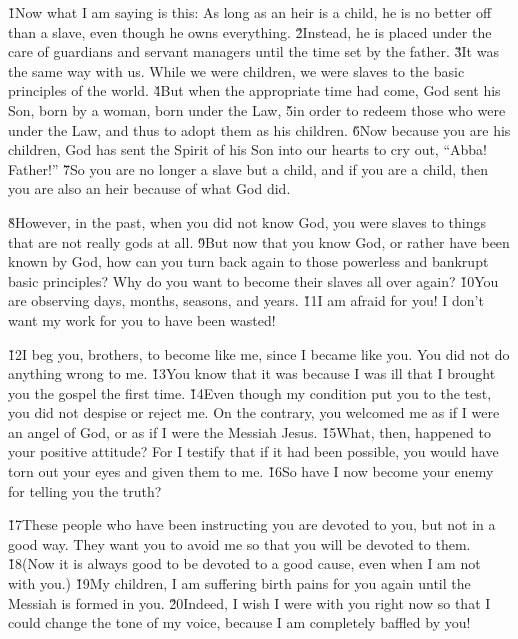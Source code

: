 \v{1}Now what I am saying is this: As long as an heir is a child, he is no better off than a slave, even though he owns everything. \v{2}Instead, he is placed under the care of guardians and servant managers until the time set by the father. \v{3}It was the same way with us. While we were children, we were slaves to the basic principles of the world. \v{4}But when the appropriate time had come, God sent his Son, born by a woman, born under the Law, \v{5}in order to redeem those who were under the Law, and thus to adopt them as his children. \v{6}Now because you are his children, God has sent the Spirit of his Son into our hearts to cry out, ``Abba! Father!'' \v{7}So you are no longer a slave but a child, and if you are a child, then you are also an heir because of what God did.

\v{8}However, in the past, when you did not know God, you were slaves to things that are not really gods at all. \v{9}But now that you know God, or rather have been known by God, how can you turn back again to those powerless and bankrupt basic principles? Why do you want to become their slaves all over again? \v{10}You are observing days, months, seasons, and years. \v{11}I am afraid for you! I don't want my work for you to have been wasted!

\v{12}I beg you, brothers, to become like me, since I became like you. You did not do anything wrong to me. \v{13}You know that it was because I was ill that I brought you the gospel the first time. \v{14}Even though my condition put you to the test, you did not despise or reject me. On the contrary, you welcomed me as if I were an angel of God, or as if I were the Messiah Jesus. \v{15}What, then, happened to your positive attitude? For I testify that if it had been possible, you would have torn out your eyes and given them to me. \v{16}So have I now become your enemy for telling you the truth?

\v{17}These people who have been instructing you are devoted to you, but not in a good way. They want you to avoid me so that you will be devoted to them. \v{18}(Now it is always good to be devoted to a good cause, even when I am not with you.) \v{19}My children, I am suffering birth pains for you again until the Messiah is formed in you. \v{20}Indeed, I wish I were with you right now so that I could change the tone of my voice, because I am completely baffled by you!

